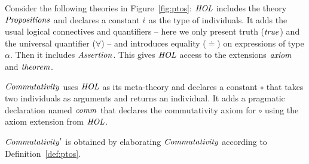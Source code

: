 \begin{example}\label{ex:ptos}
Consider the following {\mmt} theories in Figure~\ref{fig:ptos}: 
$\mathit{HOL}$ includes the {\mmt} theory $\mathit{Propositions}$ and declares a constant $i$ as the type of individuals. It adds the usual logical connectives and quantifiers -- here we only present truth ($\mathit{true}$) and the universal quantifier ($\forall$) -- and introduces equality ($\doteq$) on expressions of type $\alpha$. Then it includes $\mathit{Assertion}$. This gives $\mathit{HOL}$ access to the extensions $\mathit{axiom}$ and $\mathit{theorem}$.

$\mathit{Commutativity}$ uses $\mathit{HOL}$ as its meta-theory and declares a constant $\circ$ that takes two individuals as arguments and returns an individual. It adds a pragmatic declaration named $\mathit{comm}$ that declares the commutativity axiom for $\circ$ using the axiom extension from $\mathit{HOL}$.

$\mathit{Commutativity}'$ is obtained by elaborating $\mathit{Commutativity}$ according to
Definition~\ref{def:ptos}.
\end{example}


